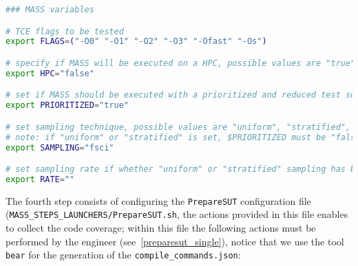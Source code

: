 \begin{lstlisting}[language=bash, label=mass_conf_specific, caption=\MASS specific variables. Excerpt of mass\_conf.sh file.]
### MASS variables

# TCE flags to be tested
export FLAGS=("-O0" "-O1" "-O2" "-O3" "-Ofast" "-Os")

# specify if MASS will be executed on a HPC, possible values are "true" or "false"
export HPC="false"

# set if MASS should be executed with a prioritized and reduced test suite
export PRIORITIZED="true"

# set sampling technique, possible values are "uniform", "stratified", and "fsci"
# note: if "uniform" or "stratified" is set, $PRIORITIZED must be "false"
export SAMPLING="fsci"

# set sampling rate if whether "uniform" or "stratified" sampling has been selected
export RATE=""
\end{lstlisting}

The fourth step consists of configuring the \texttt{PrepareSUT} configuration file \\(\texttt{MASS\_STEPS\_LAUNCHERS/PrepareSUT.sh}, the actions provided in this file enables \MASS to collect the code coverage; within this file the following actions must be performed by the engineer (see~\ref{preparesut_single}), notice that we use the tool \texttt{bear} for the generation of the \texttt{compile\_commands.json}:


